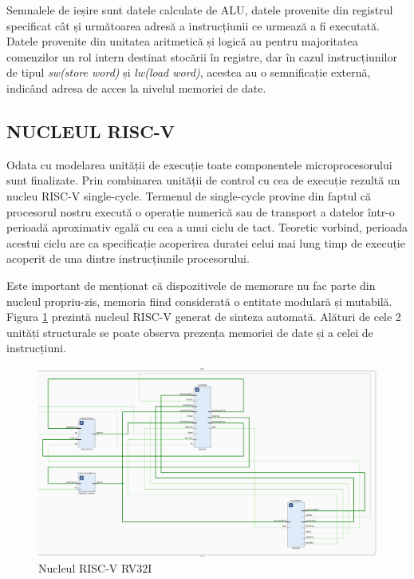 \documentclass[12pt]{article}
\begin{document}
 Semnalele de ieșire sunt datele calculate de ALU, datele provenite din registrul specificat cât și următoarea adresă a instrucțiunii ce urmează a fi executată. Datele provenite din unitatea aritmetică și logică au pentru majoritatea comenzilor un rol intern destinat stocării în registre, dar în cazul instrucțiunilor de tipul \textit{sw(store word)} și \textit{lw(load word)}, acestea au o semnificație externă, indicând adresa de acces la nivelul memoriei de date.
 
\subsection{NUCLEUL RISC-V} 
Odata cu modelarea unității de execuție toate componentele microprocesorului sunt finalizate. Prin combinarea unității de control cu cea de execuție rezultă un nucleu RISC-V single-cycle. Termenul de single-cycle provine din faptul că procesorul nostru execută o operație numerică sau de transport a datelor într-o perioadă aproximativ egală cu cea a unui ciclu de tact. Teoretic vorbind, perioada acestui ciclu are ca specificație acoperirea duratei celui mai lung timp de execuție acoperit de una dintre instrucțiunile procesorului. 


Este important de menționat că dispozitivele de memorare nu fac parte din nucleul propriu-zis, memoria fiind considerată o entitate modulară și mutabilă. Figura \ref{Figura:52} prezintă nucleul RISC-V generat de sinteza automată. Alături de cele 2 unități structurale se poate observa prezența memoriei de date și a celei de instrucțiuni.

 \begin{figure}[h!]
 \includegraphics[width=1.0\textwidth]{core.png}
 \centering
 \caption{Nucleul RISC-V RV32I}
 \label{Figura:52}
 \end{figure}
\end{document}

